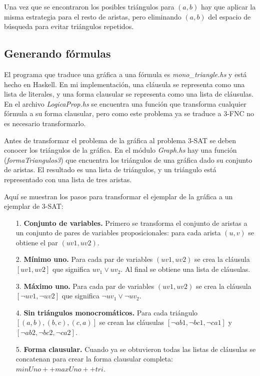 \documentclass{article}
\begin{document}
Una vez que se encontraron los posibles triángulos para $(a,b)$ hay que aplicar la misma estrategia para el resto de aristas, pero eliminando $(a,b)$ del espacio de búsqueda para evitar triángulos repetidos.

\subsection*{Generando fórmulas}

El programa que traduce una gráfica a una fórmula es \textit{mono\_triangle.hs} y está hecho en Haskell. En mi implementación, una cláusula se representa como una lista de literales, y una forma clausular se representa como una lista de cláusulas. En el archivo \textit{LogicaProp.hs} se encuentra una función que transforma cualquier fórmula a su forma clausular, pero como este problema ya se traduce a 3-FNC no es necesario transformarlo.

Antes de transformar el problema de la gráfica al problema 3-SAT se deben conocer los triángulos de la gráfica. En el módulo \textit{Graph.hs} hay una función (\textit{formaTriangulos3}) que encuentra los triángulos de una gráfica dado su conjunto de aristas. El resultado es una lista de triángulos, y un triángulo está representado con una lista de tres aristas.

Aquí se muestran los pasos para transformar el ejemplar de la gráfica a un ejemplar de 3-SAT:

\begin{itemize}
\item[1.] \textbf{Conjunto de variables.} Primero se transforma el conjunto de aristas a un conjunto de pares de variables proposicionales: para cada arista $(u,v)$ se obtiene el par $(uv1,uv2)$.
\item[2.] \textbf{Mínimo uno.} Para cada par de variables $(uv1, uv2)$ se crea la cláusula $[uv1, uv2]$ que significa $uv_1 \vee uv_2$. Al final se obtiene una lista de cláusulas.
\item[3.] \textbf{Máximo uno.} Para cada par de variables $(uv1, uv2)$ se crea la cláusula $[\neg uv1, \neg uv2]$ que significa $\neg uv_1 \vee \neg uv_2$.
\item[4.] \textbf{Sin triángulos monocromáticos.} Para cada triángulo $[(a,b), (b,c), (c,a)]$ se crean las cláusulas $[\neg ab1, \neg bc1, \neg ca1]$ y $[\neg ab2, \neg bc2, \neg ca2]$.
\item[5.] \textbf{Forma clausular.} Cuando ya se obtuvieron todas las listas de cláusulas se concatenan para crear la forma clausular completa: $minUno ++ maxUno ++ tri$.
\end{itemize}
\end{document}
